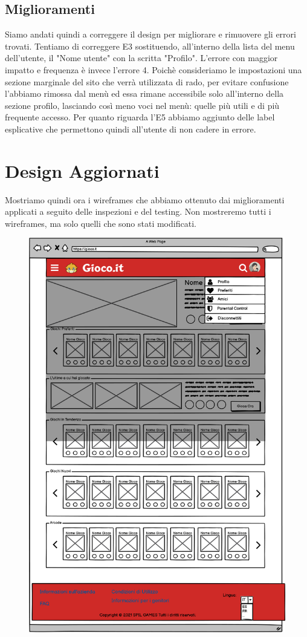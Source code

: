 \documentclass[../Report.tex]{subfiles}
\begin{document}
    \subsection{Miglioramenti}
    Siamo andati quindi a correggere il design per migliorare e rimuovere gli errori trovati. Tentiamo di correggere E3 sostituendo, all'interno della lista del menu dell'utente, il "Nome utente" con la scritta "Profilo". L'errore con maggior impatto e frequenza è invece l'errore 4. Poichè consideriamo le impostazioni una sezione marginale del sito che verrà utilizzata di rado, per evitare confusione l'abbiamo rimossa dal menù ed essa rimane accessibile solo all'interno della sezione profilo, lasciando così meno voci nel menù: quelle più utili e di più frequente accesso. Per quanto riguarda l'E5 abbiamo aggiunto delle label esplicative che permettono quindi all'utente di non cadere in errore.\\
    
    \section{Design Aggiornati}
    Mostriamo quindi ora i wireframes che abbiamo ottenuto dai miglioramenti applicati a seguito delle inspezioni e del testing. Non mostreremo tutti i wireframes, ma solo quelli che sono stati modificati. 
    \begin{figure}[H]
        \includegraphics[width=0.9\linewidth]{WProfileMenu (Clear version).png}
        \centering
    \end{figure}
\end{document}

